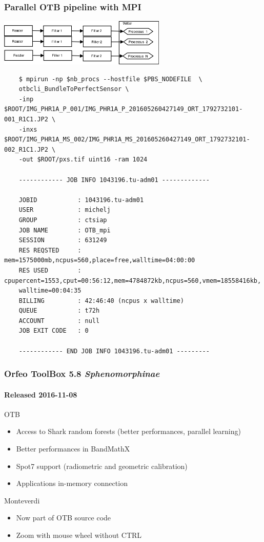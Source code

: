 \documentclass[smaller]{beamer}
\begin{document}
\begin{frame}[fragile]
\frametitle{Parallel OTB pipeline with MPI}
  \begin{center}
  \vspace{-0.5cm}
  \includegraphics[width=0.6\textwidth]{images/mpi.png}
  \begin{tiny}
\begin{verbatim}
    $ mpirun -np $nb_procs --hostfile $PBS_NODEFILE  \
    otbcli_BundleToPerfectSensor \
    -inp $ROOT/IMG_PHR1A_P_001/IMG_PHR1A_P_201605260427149_ORT_1792732101-001_R1C1.JP2 \
    -inxs $ROOT/IMG_PHR1A_MS_002/IMG_PHR1A_MS_201605260427149_ORT_1792732101-002_R1C1.JP2 \
    -out $ROOT/pxs.tif uint16 -ram 1024

    ------------ JOB INFO 1043196.tu-adm01 -------------

    JOBID           : 1043196.tu-adm01
    USER            : michelj
    GROUP           : ctsiap
    JOB NAME        : OTB_mpi
    SESSION         : 631249
    RES REQSTED     : mem=1575000mb,ncpus=560,place=free,walltime=04:00:00
    RES USED        : cpupercent=1553,cput=00:56:12,mem=4784872kb,ncpus=560,vmem=18558416kb,
    walltime=00:04:35
    BILLING         : 42:46:40 (ncpus x walltime)
    QUEUE           : t72h
    ACCOUNT         : null
    JOB EXIT CODE   : 0

    ------------ END JOB INFO 1043196.tu-adm01 ---------
\end{verbatim}
\end{tiny}
\end{center}
\end{frame}

\begin{frame}
\frametitle{Orfeo ToolBox 5.8 \textit{Sphenomorphinae}}
\framesubtitle{Released 2016-11-08}
\begin{block}{OTB}
\begin{itemize}
\item Access to Shark random forests (better performances, parallel learning)
\item Better performances in BandMathX
\item Spot7 support (radiometric and geometric calibration)
\item Applications in-memory connection
\end{itemize}
\end{block}

\begin{block}{Monteverdi}
\begin{itemize}
\item Now part of OTB source code
\item Zoom with mouse wheel without CTRL
\end{itemize}
\end{block}
\end{frame}
\end{document}
